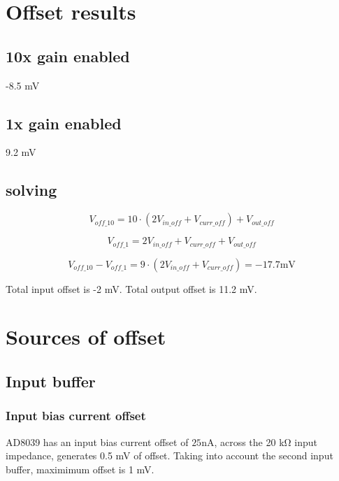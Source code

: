 \documentclass[11pt]{article}
\begin{document}
\tableofcontents
\pagebreak

\section{Offset results}
\subsection{10x gain enabled}
-8.5 \si{\milli \volt}

\subsection{1x gain enabled}
9.2 \si{\milli \volt}

\subsection{solving}

\begin{equation}
  V_{off\_10} = 10 \cdot (2 V_{in\_off} + V_{curr\_off}) + V_{out\_off}
\end{equation}

\begin{equation}
  V_{off\_1} = 2 V_{in\_off} + V_{curr\_off} + V_{out\_off}
\end{equation}

\begin{equation}
  V_{off\_10} - V_{off\_1}  = 9 \cdot (2 V_{in\_off} + V_{curr\_off}) = -17.7 \si{\milli \volt}
\end{equation}

Total input offset is -2 \si{\milli \volt}.
Total output offset is 11.2 \si{\milli \volt}.


\section{Sources of offset}
\subsection{Input buffer}
\subsubsection{Input bias current offset}
AD8039 has an input bias current offset of $25 \si{\nano \ampere}$, across the 20 \si{\kilo \ohm}
input impedance, generates 0.5 mV of offset. Taking into account the second input buffer, maximimum offset 
is 1 mV.
\end{document}
